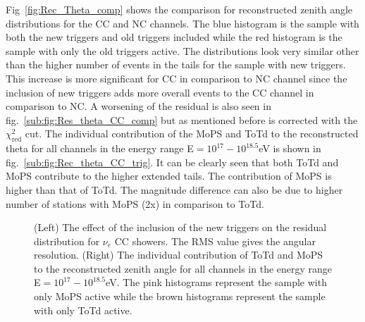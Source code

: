  Fig~\ref{fig:Rec_Theta_comp} shows the comparison for reconstructed zenith angle distributions for the CC and NC channels. The blue histogram is the sample with both the new triggers and old triggers included while the red histogram is the sample with only the old triggers active. The distributions look very similar other than the higher number of events in the tails for the sample with new triggers. This increase is more significant for CC in comparison to NC channel since the inclusion of new triggers adds more overall events to the CC channel in comparison to NC. A worsening of the residual is also seen in fig.~\ref{sub:fig:Res_theta_CC_comp} but as mentioned before is corrected with the $\chi^2_{\text{red}}$ cut. 
 The individual contribution of the MoPS and ToTd to the reconstructed theta for all channels in the energy range E$=10^{17}-10^{18.5}$eV is shown in fig.~\ref{sub:fig:Rec_theta_CC_trig}. It can be clearly seen that both ToTd and MoPS contribute to the higher extended tails. The contribution of MoPS is higher than that of ToTd. The magnitude difference can also be due to higher number of stations with MoPS (2x) in comparison to ToTd.
 
\begin{figure}[h!]
  \centering
  \hfill
  \caption{(Left) The effect of the inclusion of the new triggers on the residual distribution for $\nu_e$ CC showers. The RMS value gives the angular resolution. (Right) The individual contribution of ToTd and MoPS to the reconstructed zenith angle for all channels in the energy range E$=10^{17}-10^{18.5}$eV. The pink histograms represent the sample with only MoPS active while the brown histograms represent the sample with only ToTd active.}
  \label{fig:Res_Theta}
\end{figure}

